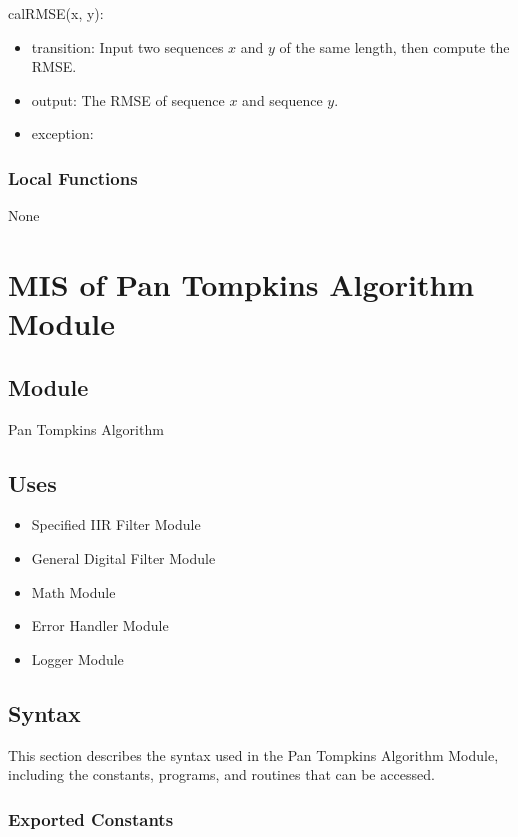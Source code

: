 \documentclass[12pt, titlepage]{article}
\begin{document}
\noindent calRMSE(x, y):
\begin{itemize}
\item transition: Input two sequences $x$ and $y$ of the same length, then
compute the RMSE.
\item output: The RMSE of sequence $x$ and sequence $y$.
\item exception: 
\end{itemize}

\subsubsection{Local Functions}

None

\newpage

\section{MIS of Pan Tompkins Algorithm Module} \label{MIS_Alg}

\subsection{Module}

Pan Tompkins Algorithm

\subsection{Uses}

\begin{itemize}
\item Specified IIR Filter Module
\item General Digital Filter Module
\item Math Module
\item Error Handler Module
\item Logger Module
\end{itemize}

\subsection{Syntax}

This section describes the syntax used in the Pan Tompkins Algorithm Module,
including the constants, programs, and routines that can be accessed.

\subsubsection{Exported Constants}
\end{document}
